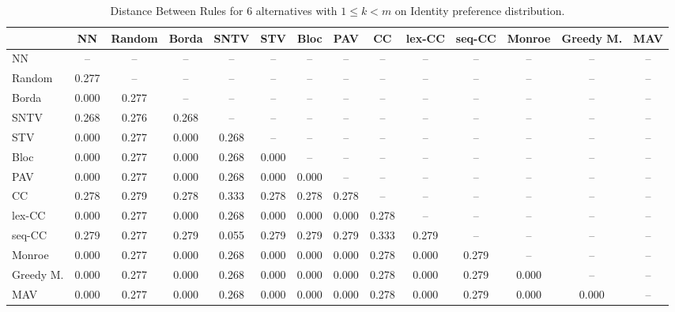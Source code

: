 
\begin{table*}
\centering
\begin{tabular}{lccccccccccccc}
\toprule
 & NN & Random & Borda & SNTV & STV & Bloc & PAV & CC & lex-CC & seq-CC & Monroe & Greedy M. & MAV \\
\midrule
NN & -- & -- & -- & -- & -- & -- & -- & -- & -- & -- & -- & -- & -- \\
Random & 0.277 & -- & -- & -- & -- & -- & -- & -- & -- & -- & -- & -- & -- \\
Borda & 0.000 & 0.277 & -- & -- & -- & -- & -- & -- & -- & -- & -- & -- & -- \\
SNTV & 0.268 & 0.276 & 0.268 & -- & -- & -- & -- & -- & -- & -- & -- & -- & -- \\
STV & 0.000 & 0.277 & 0.000 & 0.268 & -- & -- & -- & -- & -- & -- & -- & -- & -- \\
Bloc & 0.000 & 0.277 & 0.000 & 0.268 & 0.000 & -- & -- & -- & -- & -- & -- & -- & -- \\
PAV & 0.000 & 0.277 & 0.000 & 0.268 & 0.000 & 0.000 & -- & -- & -- & -- & -- & -- & -- \\
CC & 0.278 & 0.279 & 0.278 & 0.333 & 0.278 & 0.278 & 0.278 & -- & -- & -- & -- & -- & -- \\
lex-CC & 0.000 & 0.277 & 0.000 & 0.268 & 0.000 & 0.000 & 0.000 & 0.278 & -- & -- & -- & -- & -- \\
seq-CC & 0.279 & 0.277 & 0.279 & 0.055 & 0.279 & 0.279 & 0.279 & 0.333 & 0.279 & -- & -- & -- & -- \\
Monroe & 0.000 & 0.277 & 0.000 & 0.268 & 0.000 & 0.000 & 0.000 & 0.278 & 0.000 & 0.279 & -- & -- & -- \\
Greedy M. & 0.000 & 0.277 & 0.000 & 0.268 & 0.000 & 0.000 & 0.000 & 0.278 & 0.000 & 0.279 & 0.000 & -- & -- \\
MAV & 0.000 & 0.277 & 0.000 & 0.268 & 0.000 & 0.000 & 0.000 & 0.278 & 0.000 & 0.279 & 0.000 & 0.000 & -- \\
\bottomrule
\end{tabular}

\caption{Distance Between Rules for 6 alternatives with $1 \leq k < m$ on Identity preference distribution.}
\end{table*}
